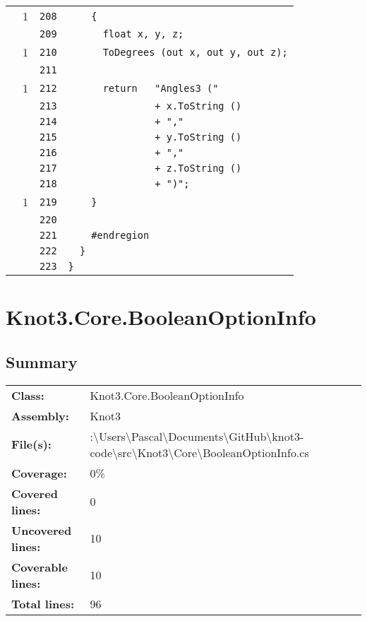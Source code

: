 \documentclass[a4paper,10pt]{article}
\begin{document}
\begin{longtable}[l]{lrrl}
\cellcolor{green} & 1 & \verb~208~ & \verb~    {~\\
\cellcolor{gray} &  & \verb~209~ & \verb~      float x, y, z;~\\
\cellcolor{green} & 1 & \verb~210~ & \verb~      ToDegrees (out x, out y, out z);~\\
\cellcolor{gray} &  & \verb~211~ & \verb~~\\
\cellcolor{green} & 1 & \verb~212~ & \verb~      return   "Angles3 ("~\\
\cellcolor{gray} &  & \verb~213~ & \verb~               + x.ToString ()~\\
\cellcolor{gray} &  & \verb~214~ & \verb~               + ","~\\
\cellcolor{gray} &  & \verb~215~ & \verb~               + y.ToString ()~\\
\cellcolor{gray} &  & \verb~216~ & \verb~               + ","~\\
\cellcolor{gray} &  & \verb~217~ & \verb~               + z.ToString ()~\\
\cellcolor{gray} &  & \verb~218~ & \verb~               + ")";~\\
\cellcolor{green} & 1 & \verb~219~ & \verb~    }~\\
\cellcolor{gray} &  & \verb~220~ & \verb~~\\
\cellcolor{gray} &  & \verb~221~ & \verb~    #endregion~\\
\cellcolor{gray} &  & \verb~222~ & \verb~  }~\\
\cellcolor{gray} &  & \verb~223~ & \verb~}~\\
\end{longtable}
\newpage
\section{Knot3.Core.BooleanOptionInfo}
\subsection{Summary}
\begin{longtable}[l]{ll}
\textbf{Class:} & Knot3.Core.BooleanOptionInfo\\
\textbf{Assembly:} & Knot3\\
\textbf{File(s):} & \begin{minipage}[t]{12cm}{:\textbackslash Users\textbackslash Pascal\textbackslash Documents\textbackslash GitHub\textbackslash knot3-code\textbackslash src\textbackslash Knot3\textbackslash Core\textbackslash BooleanOptionInfo.cs}\end{minipage} \\
\textbf{Coverage:} & 0\%\\
\textbf{Covered lines:} & 0\\
\textbf{Uncovered lines:} & 10\\
\textbf{Coverable lines:} & 10\\
\textbf{Total lines:} & 96\\
\end{longtable}
\end{document}
